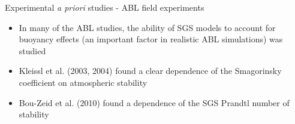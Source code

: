 \begin{frame}{Experimental {\it a priori} studies - ABL field experiments}
\begin{itemize}
	\item In many of the ABL studies, the ability of SGS models to account for buoyancy effects (an important factor in realistic ABL simulations) was studied
	\item Kleissl et al. (2003, 2004) found a clear dependence of the Smagorinsky coefficient on atmospheric stability
	\item Bou-Zeid et al. (2010) found a dependence of the SGS Prandtl number of stability
	\end{itemize}
\end{frame}






